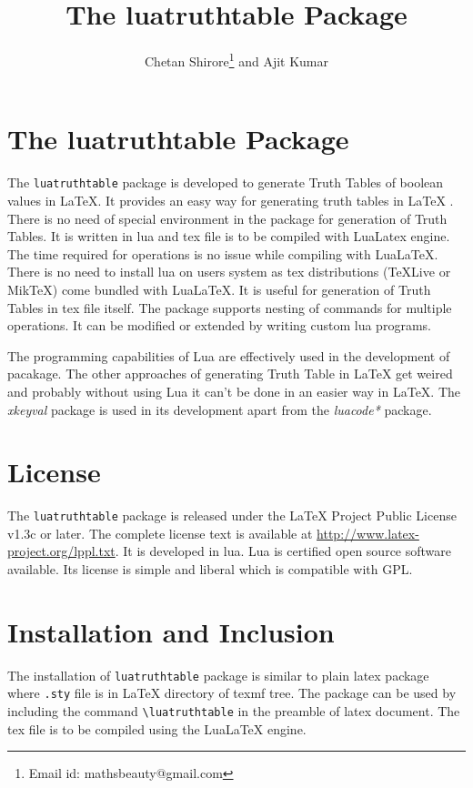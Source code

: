 \documentclass{article}
\begin{document}
\title{The luatruthtable Package}
\author{Chetan Shirore\thanks{Email id: mathsbeauty@gmail.com} \space and  Ajit Kumar}
\maketitle
\section{The luatruthtable Package}
The \verb|luatruthtable| package is developed to generate Truth Tables of boolean values in LaTeX. It provides an easy way for generating truth tables in LaTeX . There is no need of special environment in the package for generation of Truth Tables. It is written in lua and tex file is to be compiled with LuaLatex engine.  The time required for operations is no issue while compiling with LuaLaTeX.  There is no need to install lua on users system as tex distributions (TeXLive or MikTeX) come bundled with LuaLaTeX. It is useful for generation of Truth Tables in tex file itself. The package supports nesting of commands for multiple operations. It can be modified or extended by writing custom lua programs. 

The programming capabilities of Lua are effectively used in the development of pacakage. The other approaches of generating Truth Table in LaTeX get weired \cite{online.latextruthtable} and probably without using Lua it can't be done in an easier way in LaTeX.  The \emph{xkeyval} package is used in its development apart from the \emph{luacode*} package. 

\section{License} The \verb|luatruthtable| package is released under the LaTeX Project Public License v1.3c or later. The complete license text is available at \url{http://www.latex-project.org/lppl.txt}.
It is developed in lua.  Lua is certified open source software available. Its license is simple and liberal which is compatible with GPL.
\section{Installation and Inclusion}
The installation of  \verb|luatruthtable| package is similar to plain latex package where \texttt{.sty} file is in LaTeX directory of texmf tree. The package can be used by including the command \verb|\luatruthtable| in the preamble of latex document.  The tex file is to be compiled using the LuaLaTeX engine.
\end{document}
